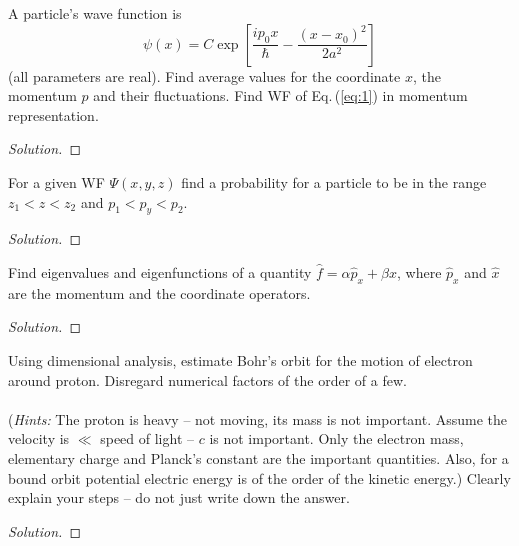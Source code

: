 \begin{problem}
A particle's wave function is
\begin{equation}
\label{eq:1}
\psi(x)=C\exp\left[\frac{ip_0x}{\hbar}-\frac{(x-x_0)^2}{2a^2}\right]
\end{equation}
(all parameters are real). Find average values for the coordinate
$x$, the momentum $p$ and their fluctuations. Find WF of
Eq.\,(\ref{eq:1}) in momentum representation.
\end{problem}
\begin{proof}[Solution]

\end{proof}
\newpage

\begin{problem}
For a given WF $\Psi(x,y,z)$ find a probability for a particle to
be in the range $z_1<z<z_2$ and $p_1<p_y<p_2$.
\end{problem}
\begin{proof}[Solution]
\end{proof}
\newpage

\begin{problem}
Find eigenvalues and eigenfunctions of a quantity $\hat
f=\alpha\hat p_x+\beta\hat x$, where $\hat p_x$ and $\hat x$ are
the momentum and the coordinate operators.
\end{problem}
\begin{proof}[Solution]
\end{proof}
\newpage

\begin{problem}
Using dimensional analysis, estimate Bohr's orbit for the
motion of electron around proton. Disregard numerical factors
of the order of a few.
\\\\
(\emph{Hints:} The proton is heavy -- not moving, its mass is not
important. Assume the velocity is $\ll$ speed of light -- $c$ is
not important. Only the electron mass, elementary charge and
Planck's constant are the important quantities. Also, for a bound
orbit potential electric energy is of the order of the kinetic
energy.) Clearly explain your steps -- do not just write down the
answer.
\end{problem}
\begin{proof}[Solution]
\end{proof}

